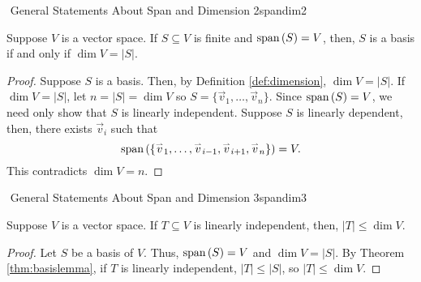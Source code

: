         \begin{theorem}{\Stop\,\,General Statements About Span and Dimension 2}{spandim2}
            
            Suppose \(V\) is a vector space. If \(S\subseteq V\) is finite and \(\text{span\,}(S)=V\), then, \(S\) is a basis if and only if \(\dim V = |S|\).
            \begin{proof}
                Suppose \(S\) is a basis. Then, by Definition \ref{def:dimension}, \(\dim V = |S|\). If \(\dim V = |S|\), let \(n=|S|=\dim V\) so \(S=\{\vec{v}_1,\ldots,\vec{v}_n\}\). Since \(\text{span\,}(S)=V\), we need only show that \(S\) is linearly independent. Suppose \(S\) is linearly dependent, then, there exists \(\vec{v}_i\) such that
                \begin{equation*}
                    \text{span\,}(\{\overset{_{\rightharpoonup}}{v}_1,\ldots,\overset{_{\rightharpoonup}}{v}_{i-1},\overset{_{\rightharpoonup}}{v}_{i+1},\overset{_{\rightharpoonup}}{v}_n\})=V.
                \end{equation*}
                This contradicts \(\dim V = n\). 
            \end{proof}

        \end{theorem}
        \pagebreak
        \begin{theorem}{\Stop\,\,General Statements About Span and Dimension 3}{spandim3}
            
            Suppose \(V\) is a vector space. If \(T\subseteq V\) is linearly independent, then, \(|T|\leq\dim V\).
            \begin{proof}
                Let \(S\) be a basis of \(V\). Thus, \(\text{span\,}(S)=V\) and \(\dim V=|S|\). By Theorem \ref{thm:basislemma}, if \(T\) is linearly independent, \(|T|\leq|S|\), so \(|T|\leq\dim V\).
            \end{proof}
        
        \end{theorem}
